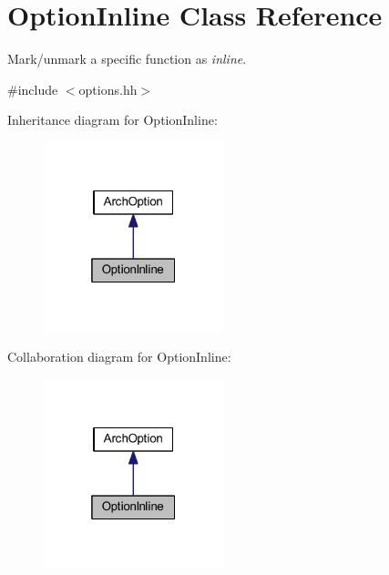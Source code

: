 \hypertarget{class_option_inline}{}\section{Option\+Inline Class Reference}
\label{class_option_inline}


Mark/unmark a specific function as {\itshape inline}.  




{\ttfamily \#include $<$options.\+hh$>$}



Inheritance diagram for Option\+Inline\+:
\nopagebreak
\begin{figure}[H]
\begin{center}
\leavevmode
\includegraphics[width=148pt]{class_option_inline__inherit__graph}
\end{center}
\end{figure}


Collaboration diagram for Option\+Inline\+:
\nopagebreak
\begin{figure}[H]
\begin{center}
\leavevmode
\includegraphics[width=148pt]{class_option_inline__coll__graph}
\end{center}
\end{figure}
